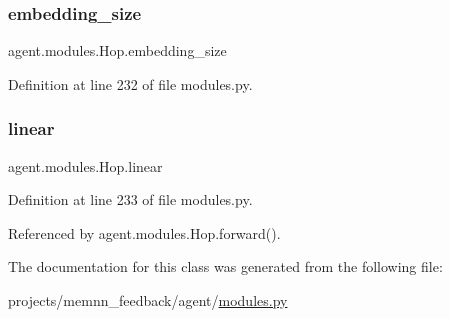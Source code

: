 \subsubsection{\texorpdfstring{embedding\+\_\+size}{embedding\_size}}
{\footnotesize\ttfamily agent.\+modules.\+Hop.\+embedding\+\_\+size}



Definition at line 232 of file modules.\+py.

\mbox{\label{classagent_1_1modules_1_1Hop_a85391af3c7d5b4784a4b83129e854c36}} 
\subsubsection{\texorpdfstring{linear}{linear}}
{\footnotesize\ttfamily agent.\+modules.\+Hop.\+linear}



Definition at line 233 of file modules.\+py.



Referenced by agent.\+modules.\+Hop.\+forward().



The documentation for this class was generated from the following file\+:\begin{DoxyCompactItemize}
\item 
projects/memnn\+\_\+feedback/agent/\hyperlink{projects_2memnn__feedback_2agent_2modules_8py}{modules.\+py}\end{DoxyCompactItemize}
